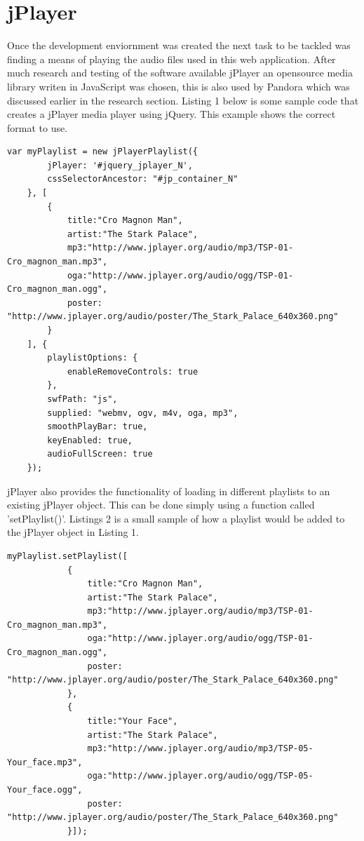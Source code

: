 \documentclass[a4paper, 12pt]{report}
\begin{document}
\section{jPlayer}
Once the development enviornment was created the next task to be tackled was finding a means of playing the audio files used in this web application. After much research and testing of the software available jPlayer\cite{jplayer} an opensource media library writen in JavaScript was chosen, this is also used by Pandora which was discussed earlier in the research section. Listing 1 below is some sample code that creates a jPlayer media player using jQuery. This example shows the correct format to use.

\begin{lstlisting}[caption=Example code to create a jPlayer media player]
	var myPlaylist = new jPlayerPlaylist({
		jPlayer: '#jquery_jplayer_N',
		cssSelectorAncestor: "#jp_container_N"
	}, [
		{
			title:"Cro Magnon Man",
			artist:"The Stark Palace",
			mp3:"http://www.jplayer.org/audio/mp3/TSP-01-Cro_magnon_man.mp3",
			oga:"http://www.jplayer.org/audio/ogg/TSP-01-Cro_magnon_man.ogg",
			poster: "http://www.jplayer.org/audio/poster/The_Stark_Palace_640x360.png"
		}
	], {
		playlistOptions: {
			enableRemoveControls: true
		},
		swfPath: "js",
		supplied: "webmv, ogv, m4v, oga, mp3",
		smoothPlayBar: true,
		keyEnabled: true,
		audioFullScreen: true
	});
\end{lstlisting}

jPlayer also provides the functionality of loading in different playlists to an existing jPlayer object. This can be done simply using a function called 'setPlaylist()'. Listings 2 is a small sample of how a playlist would be added to the jPlayer object in Listing 1.

\begin{lstlisting}[caption=Example code to add a playlist to a jPlayer object]
	myPlaylist.setPlaylist([
			{
				title:"Cro Magnon Man",
				artist:"The Stark Palace",
				mp3:"http://www.jplayer.org/audio/mp3/TSP-01-Cro_magnon_man.mp3",
				oga:"http://www.jplayer.org/audio/ogg/TSP-01-Cro_magnon_man.ogg",
				poster: "http://www.jplayer.org/audio/poster/The_Stark_Palace_640x360.png"
			},
			{
				title:"Your Face",
				artist:"The Stark Palace",
				mp3:"http://www.jplayer.org/audio/mp3/TSP-05-Your_face.mp3",
				oga:"http://www.jplayer.org/audio/ogg/TSP-05-Your_face.ogg",
				poster: "http://www.jplayer.org/audio/poster/The_Stark_Palace_640x360.png"
			}]);
\end{lstlisting}
\end{document}
